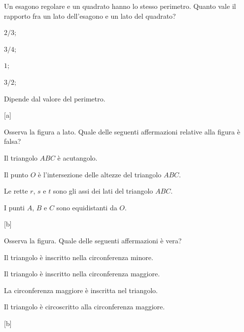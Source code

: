 \begin{esercizio}
\label{ese:5.58}
Un esagono regolare e un quadrato hanno lo stesso perimetro. Quanto 
vale il rapporto fra un lato dell'esagono e un lato del quadrato?
\begin{multicols}{2}
\begin{enumeratea}
\item $2/3$;
\item $3/4$;
\item $1$;
\item $3/2$;
\item Dipende dal valore del perimetro.
\end{enumeratea}
\end{multicols}
\hfill [a]
\end{esercizio}

\noindent\begin{minipage}{0.7\textwidth}\parindent15pt
\begin{esercizio}
\label{ese:5.59}
Osserva la figura a lato. Quale delle seguenti affermazioni relative 
alla figura è falsa?
\begin{enumeratea}
\item Il triangolo $ABC$ è acutangolo.
\item Il punto $O$ è l'intersezione delle altezze del triangolo $ABC$.
\item Le rette $r$, $s$ e $t$ sono gli assi dei lati del triangolo 
$ABC$.
\item I punti $A$, $B$ e $C$ sono equidistanti da $O$.
\end{enumeratea}
\hfill [b]
\end{esercizio}
\end{minipage}\hfil
\begin{minipage}{0.3\textwidth}
	\centering
\end{minipage}\vspace{5pt}

\noindent\begin{minipage}{0.7\textwidth}\parindent15pt
\begin{esercizio}
\label{ese:5.60}
Osserva la figura. Quale delle seguenti affermazioni è vera?
\begin{enumeratea}
\item Il triangolo è inscritto nella circonferenza minore.
\item Il triangolo è inscritto nella circonferenza maggiore.
\item La circonferenza maggiore è inscritta nel triangolo.
\item Il triangolo è circoscritto alla circonferenza maggiore.
\end{enumeratea}
\hfill [b]
\end{esercizio}
\end{minipage}\hfil
\begin{minipage}{0.3\textwidth}
	\centering
\end{minipage}\vspace{5pt}

